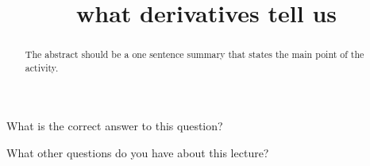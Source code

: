 \documentclass{ximera}
\title{what derivatives tell us}
\begin{document}
\begin{abstract}
  The abstract should be a one sentence summary that states the main point of the activity.
\end{abstract}

\maketitle

\begin{question}
  What is the correct answer to this question?

  \begin{solution}
    \begin{multiple-choice}
    \end{multiple-choice}  
  \end{solution}
\end{question}

What other questions do you have about this lecture?
\begin{free-response}
\end{free-response}
\end{document}
